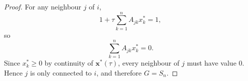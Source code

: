 \documentclass[10pt,a4paper]{amsart}
\begin{document}
\begin{proof}
    For any neighbour $j$ of $i$,
    \begin{equation*}
        1 + \tau \sum_{k=1}^{n} A_{jk} x_k^* = 1,
    \end{equation*}
    so
    \begin{equation*}
        \sum_{k=1}^{n} A_{jk} x_k^* = 0.
    \end{equation*}
    Since $x_k^* \ge 0$ by continuity of $\mathbf{x^*}(\tau)$, every neighbour of $j$ must have value $0$. Hence $j$ is only connected to $i$, and therefore $G = S_{n}$.
\end{proof}
\end{document}
